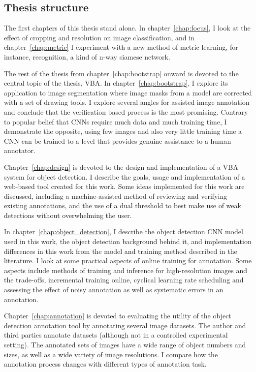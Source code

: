 \subsection {Thesis structure} 

The first chapters of this thesis stand alone. In chapter~\ref{chap:focus}, I look at the effect of cropping and resolution on image classification, and in chapter~\ref{chap:metric} I experiment with a new method of metric learning, for instance, recognition, a kind of n-way siamese network. 

The rest of the thesis from chapter~\ref{chap:bootstrap} onward is devoted to the central topic of the thesis, \gls{VBA}. In chapter~\ref{chap:bootstrap}, I explore its application to image segmentation where image masks from a model are corrected with a set of drawing tools. I explore several angles for assisted image annotation and conclude that the verification based process is the most promising. Contrary to popular belief that \gls{CNN}s require much data and much training time, I demonstrate the opposite,  using few images and also very little training time a \gls{CNN} can be trained to a level that provides genuine assistance to a human annotator. 

Chapter~\ref{chap:design} is devoted to the design and implementation of a \gls{VBA} system for object detection. I describe the goals, usage and implementation of a web-based tool created for this work. Some ideas implemented for this work are discussed, including a machine-assisted method of reviewing and verifying existing annotations, and the use of a dual threshold to best make use of weak detections without overwhelming the user.

In chapter~\ref{chap:object_detection}, I describe the object detection \gls{CNN} model used in this work, the object detection background behind it, and implementation differences in this work from the model and training method described in the literature. I look at some practical aspects of online training for annotation. Some aspects include methods of training and inference for high-resolution images and the trade-offs, incremental training online, cyclical learning rate scheduling and assessing the effect of noisy annotation as well as systematic errors in an annotation. 

Chapter~\ref{chap:annotation} is devoted to evaluating the utility of the object detection annotation tool by annotating several image datasets. The author and third parties annotate datasets (although not in a controlled experimental setting). The annotated sets of images have a wide range of object numbers and sizes, as well as a wide variety of image resolutions. I compare how the annotation process changes with different types of annotation task. 

